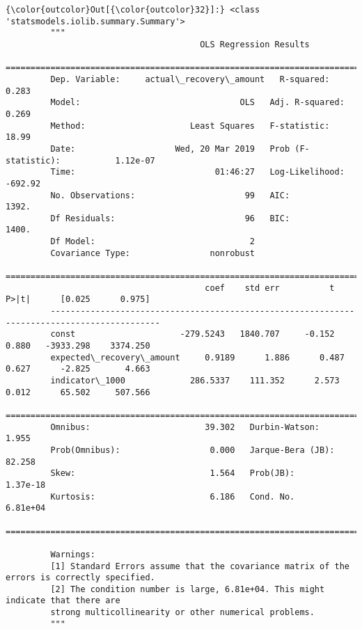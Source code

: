 \documentclass[11pt]{article}
\begin{document}
\begin{Verbatim}[commandchars=\\\{\}]
{\color{outcolor}Out[{\color{outcolor}32}]:} <class 'statsmodels.iolib.summary.Summary'>
         """
                                       OLS Regression Results                              
         ==================================================================================
         Dep. Variable:     actual\_recovery\_amount   R-squared:                       0.283
         Model:                                OLS   Adj. R-squared:                  0.269
         Method:                     Least Squares   F-statistic:                     18.99
         Date:                    Wed, 20 Mar 2019   Prob (F-statistic):           1.12e-07
         Time:                            01:46:27   Log-Likelihood:                -692.92
         No. Observations:                      99   AIC:                             1392.
         Df Residuals:                          96   BIC:                             1400.
         Df Model:                               2                                         
         Covariance Type:                nonrobust                                         
         ============================================================================================
                                        coef    std err          t      P>|t|      [0.025      0.975]
         --------------------------------------------------------------------------------------------
         const                     -279.5243   1840.707     -0.152      0.880   -3933.298    3374.250
         expected\_recovery\_amount     0.9189      1.886      0.487      0.627      -2.825       4.663
         indicator\_1000             286.5337    111.352      2.573      0.012      65.502     507.566
         ==============================================================================
         Omnibus:                       39.302   Durbin-Watson:                   1.955
         Prob(Omnibus):                  0.000   Jarque-Bera (JB):               82.258
         Skew:                           1.564   Prob(JB):                     1.37e-18
         Kurtosis:                       6.186   Cond. No.                     6.81e+04
         ==============================================================================
         
         Warnings:
         [1] Standard Errors assume that the covariance matrix of the errors is correctly specified.
         [2] The condition number is large, 6.81e+04. This might indicate that there are
         strong multicollinearity or other numerical problems.
         """
\end{Verbatim}
            

    
    
    
    
\end{document}
